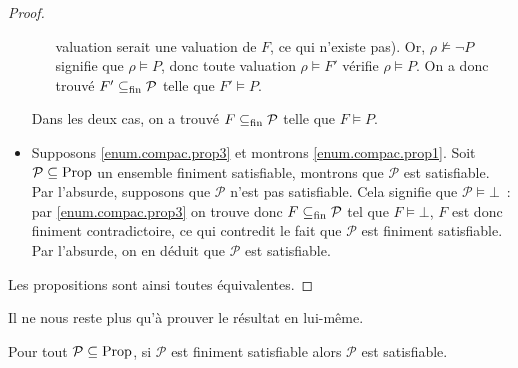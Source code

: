 \begin{proof}
\begin{itemize}
\begin{itemize}
      valuation serait une valuation de $F$, ce qui n'existe pas). Or,
      $\rho\not\models \lnot P$ signifie que $\rho\models P$, donc toute
      valuation $\rho\models F'$ vérifie $\rho\models P$. On a donc trouvé
      $F'\subseteq_{\mathrm{fin}} \mathcal P$ telle que $F'\vDash P$.
    \end{itemize}
    Dans les deux cas, on a trouvé $F\subseteq_{\mathrm{fin}} \mathcal P$ telle que $F\vDash P$.
  \item Supposons \ref{enum.compac.prop3} et montrons \ref{enum.compac.prop1}.
    Soit $\mathcal P\subseteq\operatorname{Prop}$ un ensemble finiment satisfiable, montrons
    que $\mathcal P$ est satisfiable. Par l'absurde, supposons que $\mathcal P$
    n'est pas satisfiable. Cela signifie que $\mathcal P\vDash \bot$~: par
    \ref{enum.compac.prop3} on trouve donc $F\subseteq_{\mathrm{fin}} \mathcal P$ tel que
    $F\vDash \bot$, $F$ est donc finiment contradictoire, ce qui contredit le
    fait que $\mathcal P$ est finiment satisfiable. Par l'absurde, on en déduit
    que $\mathcal P$ est satisfiable.
  \end{itemize}

  Les propositions sont ainsi toutes équivalentes.
\end{proof}

Il ne nous reste plus qu'à prouver le résultat en lui-même.

\begin{theorem}\label{thm.compac.prop}
  Pour tout $\mathcal P\subseteq\operatorname{Prop}$, si $\mathcal P$ est finiment satisfiable
  alors $\mathcal P$ est satisfiable.
\end{theorem}

